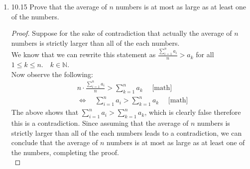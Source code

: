 \documentclass[10pt]{article}
\begin{document}
\begin{enumerate}[label={}]
      \item 10.15 Prove that the average of $n$ numbers is at most as large as at least one of the numbers.
            \begin{proof}
                  Suppose for the sake of contradiction that actually the average of $n$ numbers is strictly larger than all of the each numbers.\\
                  We know that we can rewrite this statement as $\frac{\sum_{i=1}^n a_i}{n}>a_k$ for all $1 \leq k \leq n. \quad k \in \mathbb{N}$.\\
                  Now observe the following:
                  $$
                        \begin{aligned}
                               & n \cdot \frac{\sum_{i=1}^n a_i}{n} >\sum_{k=1}^n a_k \quad \text { [math] }    \\
                               & \Leftrightarrow \quad \sum_{i=1}^n a_i>\sum_{k=1}^n a_k \quad \text { [math] }
                        \end{aligned}
                  $$
                  The above shows that $\sum_{i=1}^n a_i>\sum_{k=1}^n a_k$, which is clearly false therefore this is a contradiction. Since assuming that the average of $n$ numbers is strictly larger than all of the each numbers leads to a contradiction, we can conclude that the average of $n$ numbers is at most as large as at least one of the numbers, completing the proof.\\
            \end{proof}


\end{enumerate}
\end{document}
